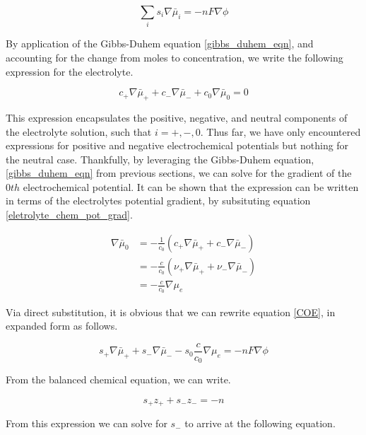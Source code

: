 \documentclass[lettersize,journal]{IEEEtran}
\begin{document}
\begin{equation}\label{COE}
\sum_{i} s_{i} \nabla \bar{\mu}_{i}=-n F \nabla \phi
\end{equation}

By application of the Gibbs-Duhem equation \ref{gibbs_duhem_eqn}, and accounting for the change from moles to concentration, we write the following expression for the electrolyte.

\begin{equation}
c_{+} \nabla \bar{\mu}_{+}+c_{-} \nabla \bar{\mu}_{-}+c_{0} \nabla \bar{\mu}_{0}=0
\end{equation}

This expression encapsulates the positive, negative, and neutral components of the electrolyte solution, such that $i = +, -, 0$. Thus far, we have only encountered expressions for positive and negative electrochemical potentials but nothing for the neutral case. Thankfully, by leveraging the Gibbs-Duhem equation, \ref{gibbs_duhem_eqn} from previous sections, we can solve for the gradient of the $0th$ electrochemical potential. It can be shown that the expression can be written in terms of the electrolytes potential gradient, by subsituting equation \ref{eletrolyte_chem_pot_grad}.

\begin{equation}
\begin{aligned}
\nabla \bar{\mu}_{0} &=-\frac{1}{c_{0}}\left(c_{+} \nabla \bar{\mu}_{+}+c_{-} \nabla \bar{\mu}_{-}\right) \\
&=-\frac{c}{c_{0}}\left(\nu_{+} \nabla \bar{\mu}_{+}+\nu_{-} \nabla \bar{\mu}_{-}\right) \\
&=-\frac{c}{c_{0}} \nabla \mu_{e}
\end{aligned}
\end{equation}

\noindent Via direct substitution, it is obvious that we can rewrite equation \ref{COE}, in expanded form as follows.

\begin{equation}
s_{+} \nabla \bar{\mu}_{+}+s_{-} \nabla \bar{\mu}_{-}-s_{0} \frac{c}{c_{0}} \nabla \mu_{e}=-n F \nabla \phi
\end{equation}

\noindent From the balanced chemical equation, we can write.

\begin{equation}
s_{+} z_{+}+s_{-} z_{-} =-n
\end{equation}

\noindent From this expression we can solve for $s_{-} $ to arrive at the following equation.
\end{document}
